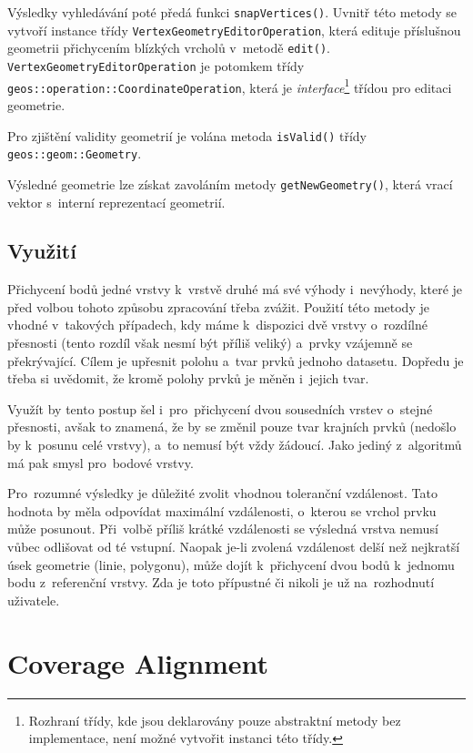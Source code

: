 Výsledky vyhledávání poté předá funkci \texttt{snap\-Vertices()}. 
Uvnitř této metody se vytvoří instance  třídy 
\texttt{Vertex\-Geometry\-Editor\-Operation}, která edituje příslušnou 
geometrii přichycením blízkých vrcholů v~metodě \texttt{edit()}. 
\texttt{Vertex\-Geometry\-Editor\-Operation} je potomkem třídy 
\texttt{geos::\-operation::\-Coordinate\-Operation}, která je 
\textit{inter\-face}\footnote{Rozhraní třídy, kde jsou deklarovány 
pouze abstraktní metody bez implementace, není možné vytvořit 
instanci této třídy.} třídou pro editaci geometrie.

Pro zjištění validity geometrií je volána metoda \texttt{isValid()} 
třídy \texttt{geos::geom::\-Geometry}.

Výsledné geometrie lze získat zavoláním metody \texttt{getNewGeometry()},
která vrací vektor s~interní reprezentací geometrií.



\subsection{Využití}
\label{vs-vyuziti}

Přichycení bodů jedné vrstvy k~vrstvě druhé má své výhody i~nevýhody, které 
je před volbou tohoto způsobu zpracování třeba zvážit. Použití této metody 
je vhodné v~takových případech, kdy máme k~dispozici dvě vrstvy o~rozdílné 
přesnosti (tento rozdíl však nesmí být příliš veliký) a~prvky vzájemně se 
překrývající. Cílem je upřesnit polohu a~tvar prvků jednoho datasetu. 
Dopředu je třeba si uvědomit, že kromě polohy prvků je měněn i~jejich tvar.

Využít by tento postup šel i~pro~přichycení dvou sousedních vrstev o~stejné 
přesnosti, avšak to znamená, že by se změnil pouze tvar krajních prvků 
(nedošlo by k~posunu celé vrstvy), a~to nemusí být vždy žádoucí. Jako jediný
z~algoritmů  má pak smysl pro~bodové vrstvy.

Pro~rozumné výsledky je důležité zvolit vhodnou toleranční vzdálenost. Tato 
hodnota by měla odpovídat maximální vzdálenosti, o~kterou se vrchol prvku 
může posunout. Při~volbě příliš krátké vzdálenosti se výsledná vrstva nemusí 
vůbec odlišovat od té vstupní. Naopak \mbox{je-li} zvolená vzdálenost delší 
než nejkratší úsek geometrie (linie, polygonu), může dojít k~přichycení dvou 
bodů k~jednomu bodu z~referenční vrstvy. Zda je toto přípustné či nikoli je 
už na~rozhodnutí uživatele.


\section{Coverage Alignment} 
\label{coverage alignment}

